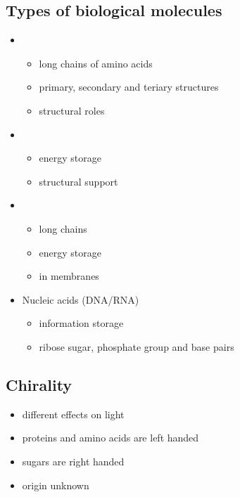 \documentclass{article}
\theoremstyle{sltheorem}
\begin{document}
\subsection{Types of biological molecules}
\begin{itemize}
    \item {}
    \begin{itemize}
        \item long chains of amino acids
        \item primary, secondary and teriary structures
        \item structural roles
    \end{itemize}
    \item {}
    \begin{itemize}
        \item energy storage
        \item structural support
    \end{itemize}
    \item {}
    \begin{itemize}
        \item long chains
        \item energy storage
        \item in membranes
    \end{itemize}
    \item Nucleic acids (DNA/RNA)
    \begin{itemize}
        \item information storage
        \item ribose sugar, phosphate group and base pairs 
    \end{itemize}
\end{itemize}
\subsection{Chirality}
\begin{itemize}
    \item different effects on light
    \item proteins and amino acids are left handed
    \item sugars are right handed
    \item origin unknown
\end{itemize}
\end{document}
